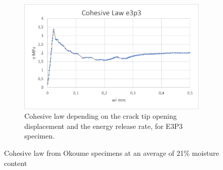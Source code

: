\begin{figure}[H]
\begin{subfigure}{0.48\linewidth}
	\includegraphics[scale=0.6]{Figures/e3p3_colaw}
	\decoRule
	\caption[Cohesive law from E3P3 specimen]{Cohesive law depending on the crack tip opening displacement and the energy release rate, for E3P3 specimen.}
	\label{fig:E3P3_colaw}
\end{subfigure}
\caption{Cohesive law from Okoume specimens at an average of 21\% moisture content}
\label{E3p_colaw}
\end{figure}


